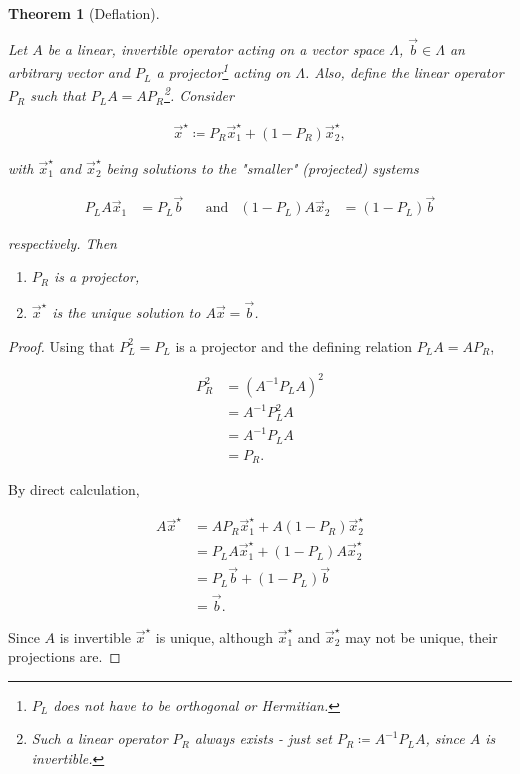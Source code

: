 \documentclass{article}
\theoremstyle{plain} %
\newtheorem{theorem}{Theorem}[section]
\theoremstyle{convention} %
\theoremstyle{remark} %
\numberwithin{equation}{section}
\begin{document}
\begin{theorem}[Deflation]

\label{thm:deflation}

Let $A$ be a linear, invertible operator acting on a vector space $\Lambda$, $\vec{b} \in \Lambda$ an arbitrary vector and $P_L$ a projector\footnote{$P_L$ does not have to be orthogonal or Hermitian.} acting on $\Lambda$. Also, define the linear operator $P_R$ such that $P_L A = A P_R$\footnote{Such a linear operator $P_R$ always exists - just set $P_R \coloneqq A^{-1} P_L A$, since $A$ is invertible.}. Consider 

\begin{align}
    \vec{x}^{\star} \coloneqq P_R \vec{x}^{\star}_1 + (1-P_R) \vec{x}^{\star}_2, \label{eq:def_projection}
\end{align}

with $\vec{x}^{\star}_1$ and $\vec{x}^{\star}_2$ being solutions to the "smaller" (projected) systems

\begin{align*}
    P_L A \vec{x}_1 &= P_L \vec{b}
    & &\text{and} &
    (1-P_L)A \vec{x}_2 &= (1-P_L)\vec{b}
\end{align*}

respectively. Then 

\begin{enumerate}[label={\arabic*)}]
  \item $P_R$ is a projector,
  \item $\vec{x}^{\star}$ is the unique solution to $A\vec{x} = \vec{b}$.
\end{enumerate}

\end{theorem}

\begin{proof}

Using that $P_L^2 = P_L$ is a projector and the defining relation $P_L A = A P_R$,

\begin{align*}
    P_R^2 &= (A^{-1} P_L A)^2 \\
    &= A^{-1} P_L^2 A \\
    &= A^{-1} P_L A \\
    &= P_R.
\end{align*}

By direct calculation,

\begin{align*}
    A \vec{x}^{\star} &= A P_R \vec{x}^{\star}_1 + A (1-P_R) \vec{x}^{\star}_2 \\
    &= P_L A \vec{x}^{\star}_1 + (1-P_L) A \vec{x}^{\star}_2 \\
    &= P_L \vec{b} + (1-P_L)\vec{b} \\
    &= \vec{b}.
\end{align*}

Since $A$ is invertible $\vec{x}^{\star}$ is unique, although $\vec{x}^{\star}_1$ and $\vec{x}^{\star}_2$ may not be unique, their projections are.

\end{proof}
\end{document}
